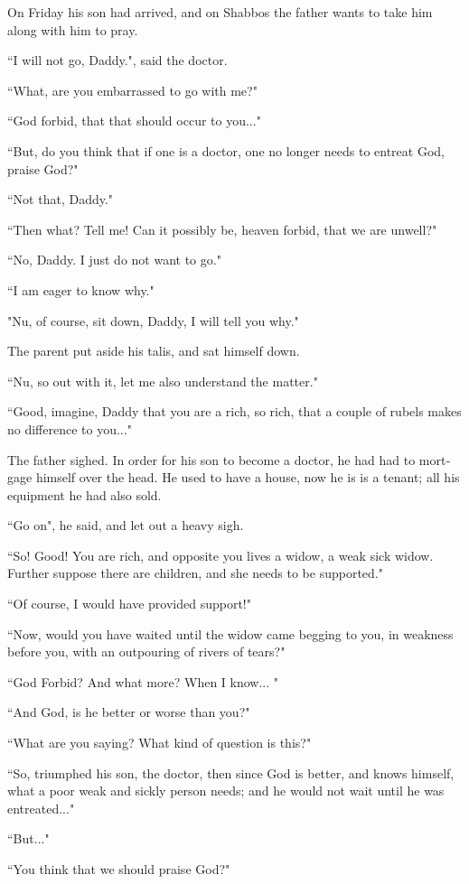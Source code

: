 \documentclass{article}
\begin{document}
\begin{pairs}
\begin{Leftside}
\begin{english}
On Friday his son had arrived, and on Shabbos the father wants to take him along with him to pray.

``I will not go, Daddy.", said the doctor.

``What, are you embarrassed to go with me?"

``God forbid, that that should occur to you..."

``But, do you think that if one is a doctor, one no longer needs to entreat God, praise God?"

``Not that, Daddy."

``Then what? Tell me! Can it possibly be, heaven forbid, that we are unwell?"

``No, Daddy. I just do not want to go."

``I am eager to know why."

"Nu, of course, sit down, Daddy, I will tell you why."

The parent put aside his talis, and sat himself down.

``Nu, so out with it, let me also understand the matter." 

``Good, imagine, Daddy that you are a rich, so rich, that a couple of rubels
makes no difference to you..."

The father sighed. In order for his son to become a doctor, he had had to mortgage himself over the head.
He used to have a house, now he is is a tenant; all his equipment he had also sold.

``Go on", he said, and let out a heavy sigh.

``So! Good! You are rich, and opposite you lives a widow, a weak sick widow. Further suppose there
are children, and she needs to be supported."

``Of course, I would have provided support!"

``Now, would you have waited until the widow came begging to you, in weakness before you, with an
outpouring of rivers of tears?"

``God Forbid? And what more? When I know... "

``And God, is he better or worse than you?"

``What are you saying? What kind of question is this?"

``So, triumphed his son, the doctor, then since God is better, and knows himself, what a poor weak and sickly person
needs; and he would not wait until he was entreated..."

``But..."

``You think that we should praise God?"


\end{english}
\end{Leftside}
\end{pairs}
\end{document}
